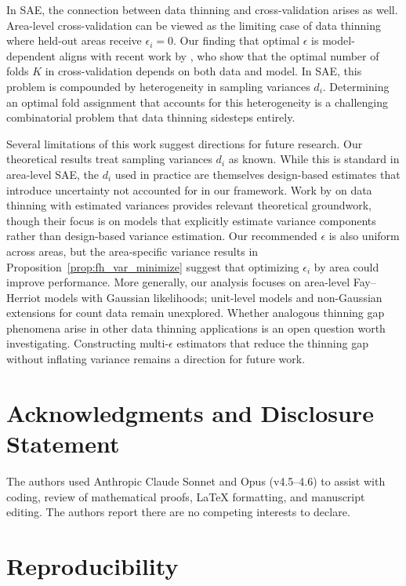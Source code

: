 \documentclass[11pt]{article}
\theoremstyle{plain}
\theoremstyle{definition}
\theoremstyle{remark}
\begin{document}
In SAE, the connection between data thinning and cross-validation arises as well. Area-level cross-validation can be viewed as the limiting case of data thinning where held-out areas receive $\epsilon_i = 0$. Our finding that optimal $\epsilon$ is model-dependent aligns with recent work by \citet{mcalinn_determining_2025}, who show that the optimal number of folds $K$ in cross-validation depends on both data and model. In SAE, this problem is compounded by heterogeneity in sampling variances $d_i$. Determining an optimal fold assignment that accounts for this heterogeneity is a challenging combinatorial problem that data thinning sidesteps entirely.

Several limitations of this work suggest directions for future research. Our theoretical results treat sampling variances $d_i$ as known. While this is standard in area-level SAE, the $d_i$ used in practice are themselves design-based estimates that introduce uncertainty not accounted for in our framework. Work by \citet{dharamshi_decomposing_2025} on data thinning with estimated variances provides relevant theoretical groundwork, though their focus is on models that explicitly estimate variance components rather than design-based variance estimation.  Our recommended $\epsilon$ is also uniform across areas, but the area-specific variance results in Proposition~\ref{prop:fh_var_minimize} suggest that optimizing $\epsilon_i$ by area could improve performance. More generally, our analysis focuses on area-level Fay--Herriot models with Gaussian likelihoods; unit-level models and non-Gaussian extensions for count data remain unexplored. Whether analogous thinning gap phenomena arise in other data thinning applications is an open question worth investigating. Constructing multi-$\epsilon$ estimators that reduce the thinning gap without inflating variance remains a direction for future work.


\section*{Acknowledgments and Disclosure Statement}

The authors used Anthropic Claude Sonnet and Opus (v4.5--4.6) to assist with coding, review of mathematical proofs, LaTeX formatting, and manuscript editing.
The authors report there are no competing interests to declare.

\section*{Reproducibility}
\end{document}
